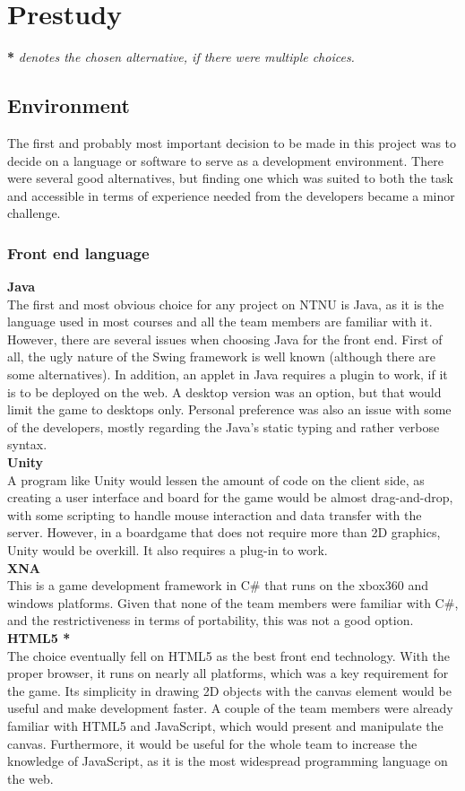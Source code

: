 \chapter{Prestudy}
\textbf{*} \emph{denotes the chosen alternative, if there were multiple choices.}

\section{Environment}
The first and probably most important decision to be made in this project was to decide on a language or software to serve as a development environment. There were several good alternatives, but finding one which was suited to both the task and accessible in terms of experience needed from the developers became a minor challenge.


\subsection{Front end language}
\textbf{Java}\\
The first and most obvious choice for any project on NTNU is Java, as it is the language used in most courses and all the team members are familiar with it. However, there are several issues when choosing Java for the front end. First of all, the ugly nature of the Swing framework is well known (although there are some alternatives). In addition, an applet in Java requires a plugin to work, if it is to be deployed on the web. A desktop version was an option, but that would limit the game to desktops only. Personal preference was also an issue with some of the developers, mostly regarding the Java’s static typing and rather verbose syntax.
\\ \newline
\textbf{Unity}\\
A program like Unity would lessen the amount of code on the client side, as creating a user interface and board for the game would be almost drag-and-drop, with some scripting to handle mouse interaction and data transfer with the server. However, in a boardgame that does not require more than 2D graphics, Unity would be overkill. It also requires a plug-in to work.
\\ \newline
\textbf{XNA}\\
This is a game development framework in C\# that runs on the xbox360 and windows platforms. Given that none of the team members were familiar with C\#, and the restrictiveness in terms of portability, this was not a good option.
\\ \newline
\textbf{HTML5 *}\\
The choice eventually fell on HTML5 as the best front end technology. With the proper browser, it runs on nearly all platforms, which was a key requirement for the game. Its simplicity in drawing 2D objects with the canvas element would be useful and make development faster. A couple of the team members were already familiar with HTML5 and JavaScript, which would present and manipulate the canvas. Furthermore, it would be useful for the whole team to increase the knowledge of JavaScript, as it is the most widespread programming language on the web.


